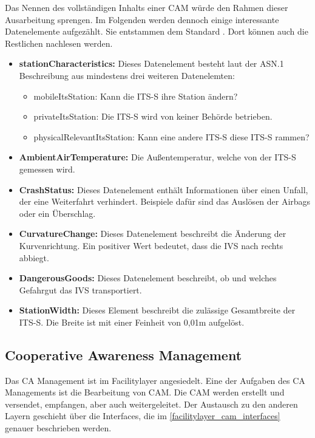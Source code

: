 Das Nennen des vollständigen Inhalts einer \ac{CAM} würde den Rahmen dieser Ausarbeitung sprengen. Im Folgenden werden dennoch einige interessante Datenelemente aufgezählt. Sie entstammen dem Standard \cite{ts102637-2}. Dort können auch die Restlichen nachlesen werden.

\begin{itemize}
	\item \textbf{stationCharacteristics: } Dieses Datenelement besteht laut der \ac{ASN.1} Beschreibung aus mindestens drei weiteren Datenelemten:
	\begin{itemize}
		\item mobileItsStation: Kann die \ac{ITS-S} ihre Station ändern?
		\item privateItsStation: Die \ac{ITS-S} wird von keiner Behörde betrieben.
		\item physicalRelevantItsStation: Kann eine andere \ac{ITS-S} diese \ac{ITS-S} rammen?
	\end{itemize}
	\item \textbf{AmbientAirTemperature: } Die Außentemperatur,  welche von der \ac{ITS-S} gemessen wird.
	\item \textbf{CrashStatus: } Dieses Datenelement enthält Informationen über einen Unfall, der eine Weiterfahrt verhindert. Beispiele dafür sind das Auslösen der Airbags oder ein Überschlag.
	\item \textbf{CurvatureChange: } Dieses Datenelement beschreibt die Änderung der Kurvenrichtung. Ein positiver Wert bedeutet, dass die \ac{IVS} nach rechts abbiegt.
	\item  \textbf{DangerousGoods: } Dieses Datenelement beschreibt, ob und welches Gefahrgut  das \ac{IVS} transportiert.
	\item \textbf{StationWidth: } Dieses Element beschreibt die zulässige Gesamtbreite der \ac{ITS-S}. Die Breite ist mit einer Feinheit von 0,01m aufgelöst.
\end{itemize}

\subsection{Cooperative Awareness Management}
Das \ac{CA} Management ist im Facilitylayer angesiedelt. Eine der Aufgaben des \ac{CA} Managements ist die Bearbeitung von \ac{CAM}. Die \ac{CAM} werden erstellt und versendet, empfangen, aber auch weitergeleitet. Der Austausch zu den anderen Layern geschieht über die Interfaces, die im \autoref{facilitylayer_cam_interfaces} genauer beschrieben werden.  

